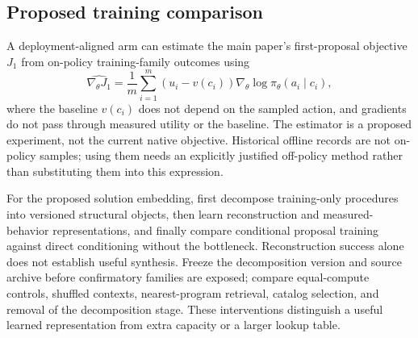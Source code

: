 \subsection{Proposed training comparison}

A deployment-aligned arm can estimate the main paper's first-proposal objective $J_1$
from on-policy training-family outcomes using
\begin{equation}
 \widehat{\nabla_\theta J_1}=
 \frac{1}{m}\sum_{i=1}^{m}
 (u_i-v(c_i))\nabla_\theta\log\pi_\theta(a_i\mid c_i),
\end{equation}
where the baseline $v(c_i)$ does not depend on the sampled action, and gradients
do not pass through measured utility or the baseline. The estimator is a
proposed experiment, not the current native objective. Historical offline
records are not on-policy samples; using them needs an explicitly justified
off-policy method rather than substituting them into this expression.

For the proposed solution embedding, first decompose training-only procedures
into versioned structural objects, then learn reconstruction and measured-behavior
representations, and finally compare conditional proposal training against
direct conditioning without the bottleneck. Reconstruction success alone does
not establish useful synthesis. Freeze the decomposition version and source
archive before confirmatory families are exposed; compare equal-compute controls,
shuffled contexts, nearest-program retrieval, catalog selection, and removal of
the decomposition stage. These interventions distinguish a useful learned
representation from extra capacity or a larger lookup table.

